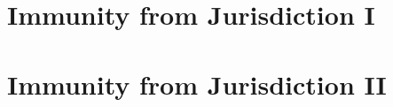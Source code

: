 \documentclass[oneside, 12pt]{book}
\begin{document}
\chapter{Immunity from Jurisdiction I}


\chapter{Immunity from Jurisdiction II}


% 

% 

% 

% 

% 

% 

\end{document}
